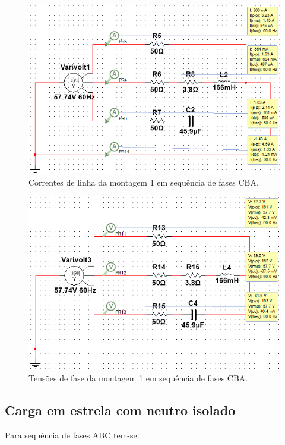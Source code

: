 \documentclass[a4paper,12pt,oneside,openany,table,xcdraw]{article}
\begin{document}
\begin{figure}[H]
\centering
\includegraphics[width=13.5cm]{m1-esquema-cba-correntes}
\caption{Correntes de linha da montagem 1 em sequência de fases CBA.}
\label{m2:IL}
\end{figure}
\begin{figure}[H]
\centering
\includegraphics[width=13.5cm]{m1-esquema-cba-vf}
\caption{Tensões de fase da montagem 1 em sequência de fases CBA.}
\label{m2:VF}
\end{figure}

\newpage
\subsection{Carga em estrela com neutro isolado}
Para sequência de fases ABC tem-se: 
\end{document}
